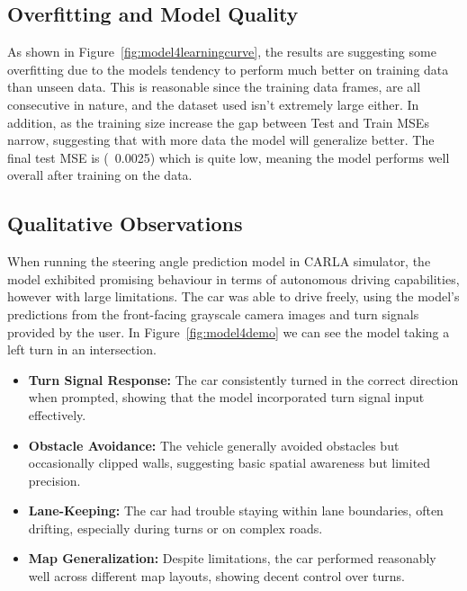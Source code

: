 \documentclass{article} %
\begin{document}
\subsection{Overfitting and Model Quality}
As shown in Figure~\ref{fig:model4learningcurve}, the results are suggesting some overfitting due to the models tendency
to perform much better on training data than unseen data. This is reasonable since the training data frames, 
are all consecutive in nature, and the dataset used isn't extremely large either. In addition, as the training size
increase the gap between Test and Train MSEs narrow, suggesting that with more data the model will generalize better. 
The final test MSE is (~0.0025) which is quite low, meaning the model performs well overall after training on the data.


\subsection{Qualitative Observations}
When running the steering angle prediction model in CARLA simulator, the model exhibited promising behaviour in terms of
autonomous driving capabilities, however with large limitations. The car was able to drive freely, using the model's predictions
from the front-facing grayscale camera images and turn signals provided by the user. In Figure~\ref{fig:model4demo} we can see 
the model taking a left turn in an intersection.

\begin{itemize}
  \item \textbf{Turn Signal Response:} The car consistently turned in the correct direction when prompted, showing that the model incorporated turn signal input effectively.

  \item \textbf{Obstacle Avoidance:} The vehicle generally avoided obstacles but occasionally clipped walls, suggesting basic spatial awareness but limited precision.

  \item \textbf{Lane-Keeping:} The car had trouble staying within lane boundaries, often drifting, especially during turns or on complex roads.

  \item \textbf{Map Generalization:} Despite limitations, the car performed reasonably well across different map layouts, showing decent control over turns.
\end{itemize}
\end{document}
